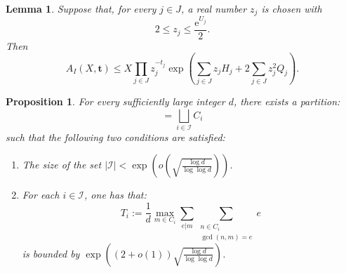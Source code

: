 \documentclass[10pt,a4paper]{amsart}
\newtheorem{prop}{Proposition}
\newtheorem{lem}{Lemma}
\begin{document}
\begin{lem}\label{lem:multi-moment}
Suppose that, for every $j\in J$, a real number $z_j$ is chosen with
\begin{equation}
 2\le z_j\le \frac{\mathrm e^{U_j}}2.
\end{equation}
Then
\begin{equation}
 A_I(X,\mathbf t)
 \le X\prod_{j\in J} z_j^{-t_j}
 \exp\!\left(\sum_{j\in J} z_jH_j
              +2\sum_{j\in J}z_j^2Q_j\right).
\end{equation}
\end{lem}

\begin{prop} \label{prop:sieve-theoretic-partition}
  For every sufficiently large integer $d$, there exists a partition:
  \begin{equation}
    [d] = \bigsqcup_{i \in \mathcal{I}} C_i
  \end{equation}
  such that the following two conditions are satisfied:
  \begin{enumerate}
    \item The size of the set $|\mathcal{I}| < \exp(o(\sqrt{\frac{\log d}{\log \log d}}))$.
    \item For each $i \in \mathcal{I}$, one has that:
    \begin{equation}\label{eq:Ti-definition}
      T_i := \frac{1}{d} \max_{m \in C_i} \sum_{e | m} \sum_{\substack{n \in C_i \\ \gcd(n, m) = e}} e
    \end{equation}
    is bounded by $\exp((2 + o(1)) \sqrt{\frac{\log d}{\log \log d}})$.
  \end{enumerate}
\end{prop}
\end{document}
